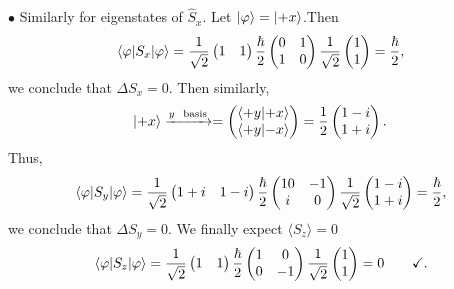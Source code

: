 \documentclass[12pt]{article}
\newcommand{\la}{\langle}
\newcommand{\ra}{\rangle}
\theoremstyle{definition}
\theoremstyle{definition}
\theoremstyle{definition}
\theoremstyle{definition}
\theoremstyle{definition}
\theoremstyle{example}
\theoremstyle{note}
\theoremstyle{remark}
\theoremstyle{example}
\begin{document}
			\noindent$\bullet$ Similarly for eigenstates of $\hat{S}_{x}$. Let $\ket{\varphi} = \ket{+x}$.Then 
			$$ \mel{\varphi}{S_{x}}{\varphi} = \frac{1}{\sqrt{2}}\begin{pmatrix}
			1 & 1
			\end{pmatrix} \frac{\hbar}{2} \begin{pmatrix}
				0 & 1 \\ 1 & 0
			\end{pmatrix} \frac{1}{\sqrt{2}} \begin{pmatrix}
				1 \\ 1
			\end{pmatrix} = \frac{\hbar}{2},$$
			we conclude that $\Delta S_{x} = 0$. Then similarly, 
			$$ \ket{+x} \xrightarrow{y \ \text{ basis}} = \begin{pmatrix}
				\braket{+y}{+x} \\\braket{+y}{-x}
			\end{pmatrix} = \frac12 \begin{pmatrix}
				1 - i \\ 1+ i
			\end{pmatrix}. $$
			Thus,
			$$ \mel{\varphi}{S_{y}}{\varphi} = \frac{1}{\sqrt{2}} \begin{pmatrix}
				 1+i & 1-i
			\end{pmatrix} \frac{\hbar}{2} \begin{pmatrix}
			1 0 & -1 \\i & 0
			\end{pmatrix}\frac{1}{\sqrt{2}} \begin{pmatrix}
			1 - i \\ 1+i
			\end{pmatrix} = \frac{\hbar}{2},$$
			we conclude that $\Delta S_{y} = 0$. We finally expect $\la S_{z} \ra = 0$
			$$ \mel{\varphi}{S_{z}}{\varphi} = \frac{1}{\sqrt{2}} \begin{pmatrix}
				 1 & 1
			\end{pmatrix} \frac{\hbar}{2} \begin{pmatrix}
				1 & 0 \\ 0 &-1 
			\end{pmatrix} \frac{1}{\sqrt{2}} \begin{pmatrix}
			1 \\ 1 
			\end{pmatrix} = 0 \qquad \checkmark.$$
\end{document}

